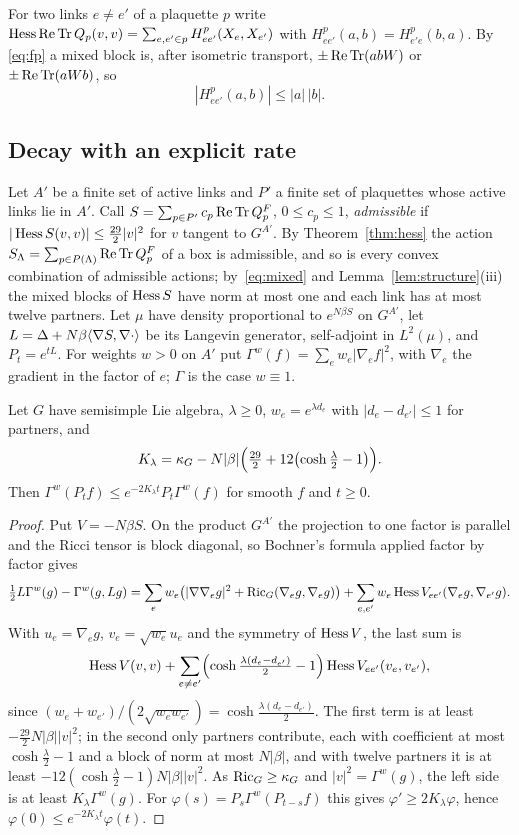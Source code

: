 For two links $e\ne e'$ of a plaquette $p$ write $\operatorname{Hess}\operatorname{Re}\operatorname{Tr} Q_p(v,v)=
\sum_{e,e'\in p}H^p_{ee'}(X_e,X_{e'})$ with $H^p_{ee'}(a,b)=H^p_{e'e}(b,a)$. By
\eqref{eq:fp} a mixed block is, after isometric transport, $\pm\operatorname{Re}\operatorname{Tr}(abW)$ or
$\pm\operatorname{Re}\operatorname{Tr}(aWb)$, so
\begin{equation}\label{eq:mixed}
|H^p_{ee'}(a,b)|\le|a|\,|b| .
\end{equation}

\subsection{Decay with an explicit rate}

Let $A'$ be a finite set of active links and $P'$ a finite set of plaquettes
whose active links lie in $A'$. Call $S=\sum_{p\in P'}c_p\operatorname{Re}\operatorname{Tr} Q^F_p$, $0\le
c_p\le1$, \emph{admissible} if $|\operatorname{Hess} S(v,v)|\le\frac{29}2|v|^2$ for $v$
tangent to $G^{A'}$. By Theorem~\ref{thm:hess} the action $S_\Lambda=\sum_{p\in
P(\Lambda)}\operatorname{Re}\operatorname{Tr} Q^F_p$ of a box is admissible, and so is every convex combination
of admissible actions; by~\eqref{eq:mixed} and Lemma~\ref{lem:structure}(iii)
the mixed blocks of $\operatorname{Hess} S$ have norm at most one and each link has at most
twelve partners. Let $\mu$ have density proportional to $e^{N\beta S}$ on
$G^{A'}$, let $L=\Delta+N\beta\langle \nabla S,\nabla\cdot\rangle$ be its Langevin generator,
self-adjoint in $L^2(\mu)$, and $P_t=e^{tL}$. For weights $w>0$ on $A'$ put
$\Gamma^w(f)=\sum_ew_e|\nabla_ef|^2$, with $\nabla_e$ the gradient in the factor of
$e$; $\Gamma$ is the case $w\equiv1$.

\begin{lemma}\label{lem:weighted}
Let $G$ have semisimple Lie algebra, $\lambda\ge0$, $w_e=e^{\lambda d_e}$ with
$|d_e-d_{e'}|\le1$ for partners, and
\[
K_\lambda=\kappa_G-N|\beta|\Bigl(\tfrac{29}2+12\bigl(\cosh\tfrac\lambda2-1\bigr)\Bigr).
\]
Then $\Gamma^w(P_tf)\le e^{-2K_\lambda t}P_t\Gamma^w(f)$ for smooth $f$ and $t\ge0$.
\end{lemma}

\begin{proof}
Put $V=-N\beta S$. On the product $G^{A'}$ the projection to one factor is
parallel and the Ricci tensor is block diagonal, so Bochner's formula
applied factor by factor gives
\[
\tfrac12L\Gamma^w(g)-\Gamma^w(g,Lg)=\sum_ew_e\bigl(|\nabla\nabla_eg|^2+\operatorname{Ric}_G(\nabla_e
g,\nabla_eg)\bigr)+\sum_{e,e'}w_e\operatorname{Hess} V_{ee'}(\nabla_eg,\nabla_{e'}g).
\]
With $u_e=\nabla_eg$, $v_e=\sqrt{w_e}u_e$ and the symmetry of $\operatorname{Hess} V$, the last
sum is
\[
\operatorname{Hess} V(v,v)+\sum_{e\ne e'}\Bigl(\cosh\tfrac{\lambda(d_e-d_{e'})}2-1\Bigr)\operatorname{Hess}
V_{ee'}(v_e,v_{e'}),
\]
since $(w_e+w_{e'})/(2\sqrt{w_ew_{e'}})=\cosh\frac{\lambda(d_e-d_{e'})}2$. The first
term is at least $-\frac{29}2N|\beta||v|^2$; in the second only partners
contribute, each with coefficient at most $\cosh\frac\lambda2-1$ and a block of
norm at most $N|\beta|$, and with twelve partners it is at least
$-12(\cosh\frac\lambda2-1)N|\beta||v|^2$. As $\operatorname{Ric}_G\ge\kappa_G$ and $|v|^2=
\Gamma^w(g)$, the left side is at least $K_\lambda\Gamma^w(g)$. For
$\varphi(s)=P_s\Gamma^w(P_{t-s}f)$ this gives $\varphi'\ge2K_\lambda\varphi$, hence
$\varphi(0)\le e^{-2K_\lambda t}\varphi(t)$.
\end{proof}


